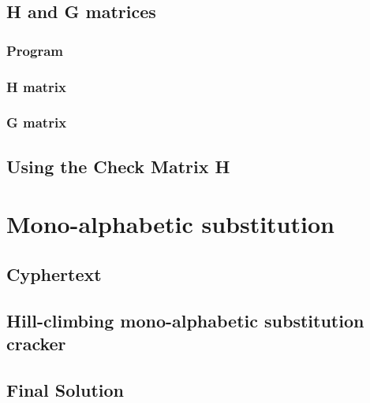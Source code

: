 \documentclass[pdftex, 12pt, a4paper]{article}
\begin{document}
\subsection{H and G matrices}
\subsubsection{Program}\label{hammgen-hg}

\subsubsection{H matrix}\label{h-matrix}
\subsubsection{G matrix}\label{g-matrix}
\pagebreak

\subsection{Using the Check Matrix H}\label{check-matrix}

\pagebreak

\section{Mono-alphabetic substitution}
\subsection{Cyphertext}\label{q3-cyphertext}

\subsection{Hill-climbing mono-alphabetic substitution cracker}\label{break-simplesub}

\pagebreak

\subsection{Final Solution}\label{q3-solution}
\pagebreak
\end{document}
